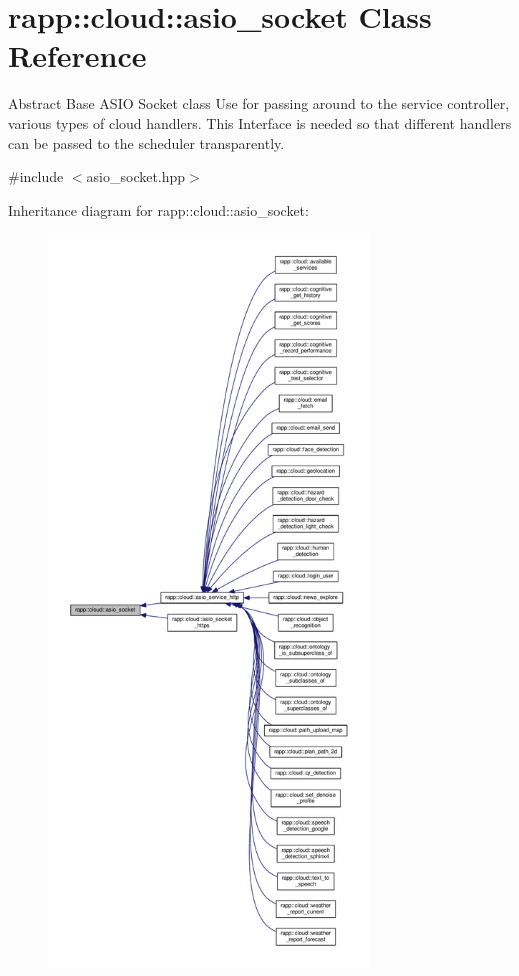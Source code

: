 \hypertarget{classrapp_1_1cloud_1_1asio__socket}{\section{rapp\-:\-:cloud\-:\-:asio\-\_\-socket Class Reference}
\label{classrapp_1_1cloud_1_1asio__socket}
}


Abstract Base A\-S\-I\-O Socket class Use for passing around to the service controller, various types of cloud handlers. This Interface is needed so that different handlers can be passed to the scheduler transparently.  




{\ttfamily \#include $<$asio\-\_\-socket.\-hpp$>$}



Inheritance diagram for rapp\-:\-:cloud\-:\-:asio\-\_\-socket\-:
\nopagebreak
\begin{figure}[H]
\begin{center}
\leavevmode
\includegraphics[height=550pt]{classrapp_1_1cloud_1_1asio__socket__inherit__graph}
\end{center}
\end{figure}

